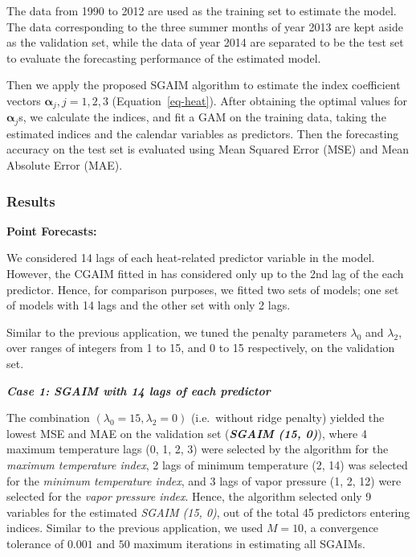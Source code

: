 \documentclass[11pt,a4paper,]{article}
\begin{document}
The data from 1990 to 2012 are used as the training set to estimate the
model. The data corresponding to the three summer months of year 2013
are kept aside as the validation set, while the data of year 2014 are
separated to be the test set to evaluate the forecasting performance of
the estimated model.

Then we apply the proposed SGAIM algorithm to estimate the index
coefficient vectors \(\bm{\alpha}_{j}, j = 1, 2, 3\)
(Equation~\ref{eq-heat}). After obtaining the optimal values for
\(\bm{\alpha}_{j}\)s, we calculate the indices, and fit a GAM on the
training data, taking the estimated indices and the calendar variables
as predictors. Then the forecasting accuracy on the test set is
evaluated using Mean Squared Error (MSE) and Mean Absolute Error (MAE).

\hypertarget{results}{%
\subsubsection{Results}\label{results}}

\textbf{Point Forecasts:}

We considered 14 lags of each heat-related predictor variable in the
model. However, the CGAIM fitted in \textcite{Masselot2022} has
considered only up to the 2nd lag of the each predictor. Hence, for
comparison purposes, we fitted two sets of models; one set of models
with 14 lags and the other set with only 2 lags.

Similar to the previous application, we tuned the penalty parameters
\(\lambda_{0}\) and \(\lambda_{2}\), over ranges of integers from 1 to
15, and 0 to 15 respectively, on the validation set.

\textbf{\emph{Case 1: SGAIM with 14 lags of each predictor}}

The combination \((\lambda_{0} = 15, \lambda_{2} = 0)\) (i.e.~without
ridge penalty) yielded the lowest MSE and MAE on the validation set
(\textbf{\emph{SGAIM (15, 0)}}), where 4 maximum temperature lags (0, 1,
2, 3) were selected by the algorithm for the \emph{maximum temperature
index}, 2 lags of minimum temperature (2, 14) was selected for the
\emph{minimum temperature index}, and 3 lags of vapor pressure (1, 2,
12) were selected for the \emph{vapor pressure index}. Hence, the
algorithm selected only 9 variables for the estimated \emph{SGAIM (15,
0)}, out of the total 45 predictors entering indices. Similar to the
previous application, we used \(M = 10\), a convergence tolerance of
\(0.001\) and \(50\) maximum iterations in estimating all SGAIMs.
\end{document}
